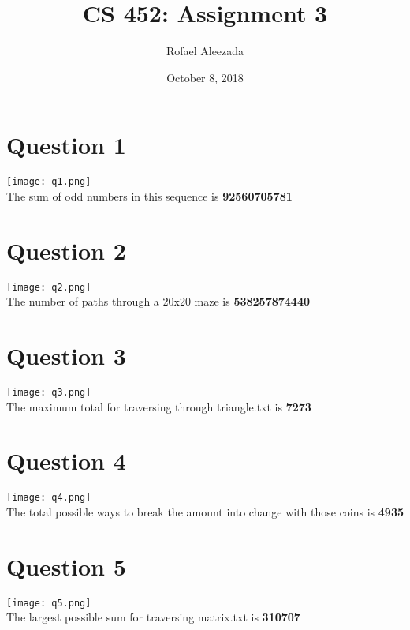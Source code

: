 \documentclass{article}
\title{CS 452: Assignment 3}
\date{October 8, 2018}
\author{Rofael Aleezada}
\begin{document}
	\maketitle
	
	\section{Question 1}
	\begin{center}
		\texttt{[image: q1.png]} \\
		The sum of odd numbers in this sequence is \textbf{92560705781}
	\end{center}

	\section{Question 2}
	\begin{center}
		\texttt{[image: q2.png]} \\
		The number of paths through a 20x20 maze is \textbf{538257874440}
	\end{center}
	
	\section{Question 3}
	\begin{center}
		\texttt{[image: q3.png]} \\
		The maximum total for traversing through triangle.txt is \textbf{7273}
	\end{center}

	\section{Question 4}
	\begin{center}
		\texttt{[image: q4.png]} \\
		The total possible ways to break the amount into change with those coins is \textbf{4935}
	\end{center}
	
	\section{Question 5}
	\begin{center}
		\texttt{[image: q5.png]} \\
		The largest possible sum for traversing matrix.txt is \textbf{310707}
	\end{center}
\end{document}
